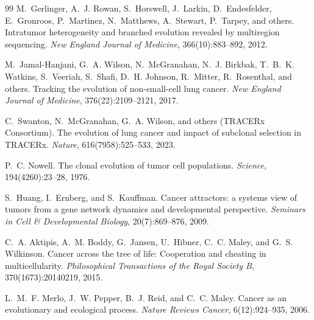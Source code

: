\documentclass[11pt]{article}
\begin{document}
\begin{thebibliography}{99}
M.~Gerlinger, A.~J. Rowan, S.~Horswell, J.~Larkin, D.~Endesfelder,
  E.~Gronroos, P.~Martinez, N.~Matthews, A.~Stewart, P.~Tarpey, and others.
\newblock Intratumor heterogeneity and branched evolution revealed by
  multiregion sequencing.
\newblock \emph{New England Journal of Medicine}, 366(10):883--892, 2012.

M.~Jamal-Hanjani, G.~A. Wilson, N.~McGranahan, N.~J. Birkbak,
  T.~B.~K. Watkins, S.~Veeriah, S.~Shafi, D.~H. Johnson,
  R.~Mitter, R.~Rosenthal, and others.
\newblock Tracking the evolution of non-small-cell lung cancer.
\newblock \emph{New England Journal of Medicine}, 376(22):2109--2121, 2017.

C.~Swanton, N.~McGranahan, G.~A. Wilson, and others (TRACERx Consortium).
\newblock The evolution of lung cancer and impact of subclonal selection
  in {TRACERx}.
\newblock \emph{Nature}, 616(7958):525--533, 2023.

P.~C. Nowell.
\newblock The clonal evolution of tumor cell populations.
\newblock \emph{Science}, 194(4260):23--28, 1976.

S.~Huang, I.~Ernberg, and S.~Kauffman.
\newblock Cancer attractors: a systems view of tumors from a gene network
  dynamics and developmental perspective.
\newblock \emph{Seminars in Cell \& Developmental Biology}, 20(7):869--876,
  2009.

C.~A. Aktipis, A.~M. Boddy, G.~Jansen, U.~Hibner, C.~C. Maley, and
  G.~S. Wilkinson.
\newblock Cancer across the tree of life: Cooperation and cheating in
  multicellularity.
\newblock \emph{Philosophical Transactions of the Royal Society B},
  370(1673):20140219, 2015.

L.~M.~F. Merlo, J.~W. Pepper, B.~J. Reid, and C.~C. Maley.
\newblock Cancer as an evolutionary and ecological process.
\newblock \emph{Nature Reviews Cancer}, 6(12):924--935, 2006.

\end{thebibliography}

\clearpage
\appendix
\end{document}
